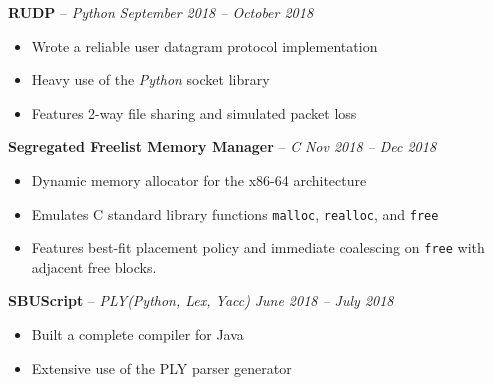 \documentclass[10pt,letterpaper]{article}
\begin{document}
										
\headedsection 
{\textbf{RUDP} -- \textit{Python}}
{\textit{September 2018 -- October 2018}} {
	\begin{itemize}[noitemsep,nolistsep]
		\item Wrote a reliable user datagram protocol implementation
		\item Heavy use of the \textit{Python} socket library
		\item Features 2-way file sharing and simulated packet loss
	\end{itemize}
}	


\headedsection 
{\textbf{Segregated Freelist Memory Manager} -- \textit{C}}
{\textit{Nov 2018 -- Dec 2018}} {
	\begin{itemize}[noitemsep,nolistsep]
		\item Dynamic memory allocator for the x86-64 architecture
		\item Emulates C standard library functions \texttt{malloc}, \texttt{realloc}, and \texttt{free}
		\item Features best-fit placement policy and immediate coalescing on \texttt{free} with adjacent free blocks.	      		      		      		      		
	\end{itemize}
}
										

\headedsection 
{\textbf{SBUScript} -- \textit{PLY(Python, Lex, Yacc)}}
{\textit{June 2018 -- July 2018}} {
	\begin{itemize}[noitemsep,nolistsep]
		\item Built a complete compiler for Java
		\item Extensive use of the PLY parser generator
	\end{itemize}
}
										
\spacedhrule{0.3em}{-0.6em} 
\end{document}

